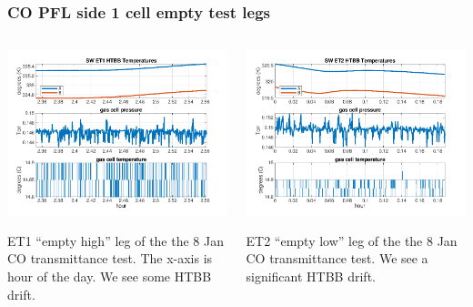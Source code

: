 \documentclass[10pt]{beamer}
\begin{document}
\begin{frame}
\frametitle{CO PFL side 1 cell empty test legs}
\begin{columns}[t]
\begin{column}{0.5\textwidth}
  \begin{centering}
  \includegraphics[width=\textwidth]{harvest_01-07/01-08_SW_ET1.png}
  \end{centering}\vspace{3mm}

  ET1 ``empty high'' leg of the the 8 Jan CO transmittance test.
  The x-axis is hour of the day.  We see some HTBB drift.

\end{column}
\begin{column}{0.5\textwidth}  
  \begin{centering}
  \includegraphics[width=\textwidth]{harvest_01-07/01-08_SW_ET2.png}
  \end{centering}\vspace{3mm}

  ET2 ``empty low'' leg of the the 8 Jan CO transmittance test.
  We see a significant HTBB drift.

\end{column}
\end{columns}
\end{frame}
\end{document}
